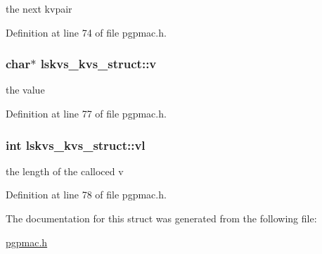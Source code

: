 the next kvpair 



Definition at line 74 of file pgpmac.\-h.

\hypertarget{structlskvs__kvs__struct_a27a0ae4415b6d65c8a9f9fac11c130f9}{
\subsubsection[{v}]{\setlength{\rightskip}{0pt plus 5cm}char$\ast$ lskvs\-\_\-kvs\-\_\-struct\-::v}}\label{structlskvs__kvs__struct_a27a0ae4415b6d65c8a9f9fac11c130f9}


the value 



Definition at line 77 of file pgpmac.\-h.

\hypertarget{structlskvs__kvs__struct_aa1c980ae62cdf78d8b358b3a51deda6a}{
\subsubsection[{vl}]{\setlength{\rightskip}{0pt plus 5cm}int lskvs\-\_\-kvs\-\_\-struct\-::vl}}\label{structlskvs__kvs__struct_aa1c980ae62cdf78d8b358b3a51deda6a}


the length of the calloced v 



Definition at line 78 of file pgpmac.\-h.



The documentation for this struct was generated from the following file\-:\begin{DoxyCompactItemize}
\item 
\hyperlink{pgpmac_8h}{pgpmac.\-h}\end{DoxyCompactItemize}
